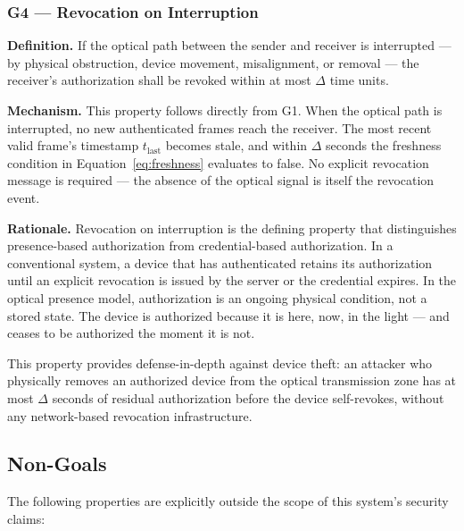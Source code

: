\documentclass[conference]{IEEEtran}
\begin{document}
\subsubsection{G4 — Revocation on Interruption}

\textbf{Definition.} If the optical path between the sender and receiver is interrupted — by physical obstruction, device movement, misalignment, or removal — the receiver's authorization shall be revoked within at most $\Delta$ time units.

\textbf{Mechanism.} This property follows directly from G1. When the optical path is interrupted, no new authenticated frames reach the receiver. The most recent valid frame's timestamp $t_{\text{last}}$ becomes stale, and within $\Delta$ seconds the freshness condition in Equation~\eqref{eq:freshness} evaluates to false. No explicit revocation message is required — the absence of the optical signal is itself the revocation event.

\textbf{Rationale.} Revocation on interruption is the defining property that distinguishes presence-based authorization from credential-based authorization. In a conventional system, a device that has authenticated retains its authorization until an explicit revocation is issued by the server or the credential expires. In the optical presence model, authorization is an ongoing physical condition, not a stored state. The device is authorized because it is here, now, in the light — and ceases to be authorized the moment it is not.

This property provides defense-in-depth against device theft: an attacker who physically removes an authorized device from the optical transmission zone has at most $\Delta$ seconds of residual authorization before the device self-revokes, without any network-based revocation infrastructure.

\subsection{Non-Goals}

The following properties are explicitly outside the scope of this system's security claims:
\end{document}
